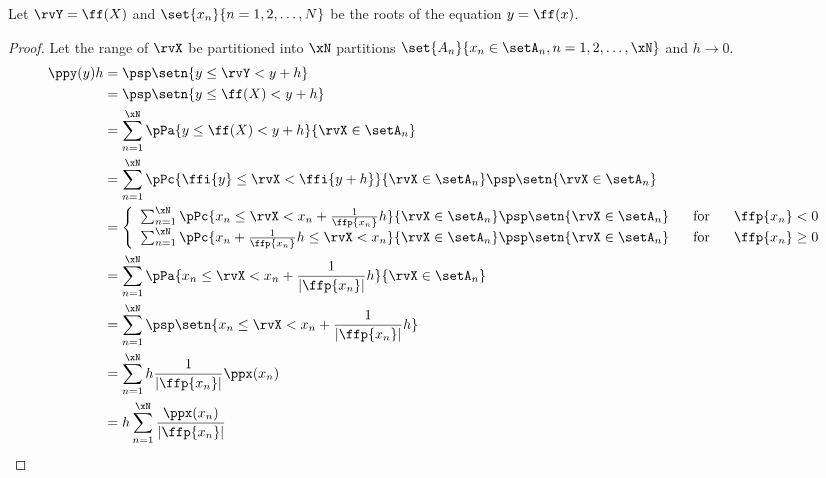 \begin{theorem}
\label{thm:Y=f(X)}
Let $\rvY=\ff(X)$ and $\set{x_n}{n=1,2,\ldots,N}$ be the roots of the equation
$y=\ff(x)$.
\end{theorem}
\begin{proof}
Let the range of $\rvX$ be partitioned into $\xN$ partitions
$\set{A_n}{x_n\in\setA_n, n=1,2,\ldots,\xN}$ and $h\to0$.
\begin{align*}
  \ppy(y)h
    &= \psp\setn{y \le\rvY < y+h}
  \\&= \psp\setn{y \le \ff(X) < y+h}
  \\&= \sum_{n=1}^{\xN} \pPa{y \le \ff(X) < y+h}{\rvX\in\setA_n}
  \\&= \sum_{n=1}^{\xN} \pPc{\ffi{y} \le\rvX < \ffi{y+h}}{\rvX\in\setA_n}\psp\setn{\rvX\in\setA_n}
  \\&= \left\{\begin{array}{l@{\hspace{4ex}\mbox{for}\hspace{4ex}}l}
         \sum_{n=1}^{\xN} \pPc{x_n     \le\rvX < x_n + \frac{1}{\ffp{x_n}}h}{\rvX\in\setA_n}\psp\setn{\rvX\in\setA_n} & \ffp{x_n}<0 \\
         \sum_{n=1}^{\xN} \pPc{x_n + \frac{1}{\ffp{x_n}}h \le\rvX < x_n}{\rvX\in\setA_n}\psp\setn{\rvX\in\setA_n}     & \ffp{x_n}\ge0
       \end{array}\right.
  \\&= \sum_{n=1}^{\xN} \pPa{x_n     \le\rvX < x_n + \frac{1}{|\ffp{x_n}|}h}{\rvX\in\setA_n}
  \\&= \sum_{n=1}^{\xN} \psp\setn{x_n     \le\rvX < x_n + \frac{1}{|\ffp{x_n}|}h}
  \\&= \sum_{n=1}^{\xN} h \frac{1}{|\ffp{x_n}|} \ppx(x_n)
  \\&= h \sum_{n=1}^{\xN} \frac{\ppx(x_n)}{|\ffp{x_n}|}
\end{align*}
\end{proof}

